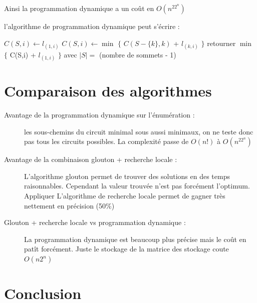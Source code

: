 \documentclass[11pt]{article} \usepackage[top=2cm, bottom=2cm, left=2cm, right=2cm]{geometry}
\begin{document}
Ainsi la programmation dynamique a un coût en $O(n^22^n)$

l'algorithme de programmation dynamique peut s'écrire :
\begin{algorithmic}[]
\State $C(S,i) \gets l_{(1,i)}$
\EndFor
\Else
{}
\State $C(S,i) \gets \min$ $\{$ $C(S - \{ k \} ,k)$ + $l_{(k,i)}$ $\}$
\EndFor
\EndFor
\EndIf
\EndFor
\State retourner $\min$ $\{$ C(S,i) + $l_{(1,i)}$ $\}$ avec $|S| = $
(nombre de sommets - 1)
\end{algorithmic}

\section{Comparaison des algorithmes}
\begin{description}
    \item[Avantage de la programmation dynamique sur l'énumération :] les sous-chemins du circuit minimal sous aussi
  minimaux, on ne teste donc pas tous les circuits possibles. La complexité passe de $O(n!)$ à $O(n^22^n)$
  \item[Avantage de la combinaison glouton + recherche locale :] L'algorithme glouton permet de trouver des solutions en
des temps raisonnables. Cependant la valeur trouvée n'est pas forcément l'optimum. Appliquer L'algorithme de recherche
locale permet de gagner très nettement en précision (50\%)
\item[Glouton + recherche locale vs programmation dynamique :] La programmation dynamique est beaucoup plus précise mais
le coût en patît forcément. Juste le stockage de la matrice des stockage coute $O(n2^n)$

\end{description}
\section{Conclusion}
\end{document}
